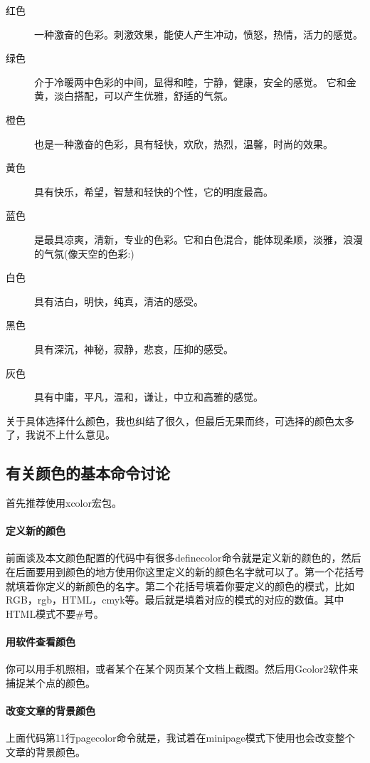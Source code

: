 \documentclass[11pt,oneside]{book}
\begin{document}
\begin{common-format}
\begin{description}
\item[红色] 一种激奋的色彩。刺激效果，能使人产生冲动，愤怒，热情，活力的感觉。
\item[绿色] 介于冷暖两中色彩的中间，显得和睦，宁静，健康，安全的感觉。 它和金黄，淡白搭配，可以产生优雅，舒适的气氛。
\item[橙色] 也是一种激奋的色彩，具有轻快，欢欣，热烈，温馨，时尚的效果。
\item[黄色] 具有快乐，希望，智慧和轻快的个性，它的明度最高。 
\item[蓝色] 是最具凉爽，清新，专业的色彩。它和白色混合，能体现柔顺，淡雅，浪漫的气氛(像天空的色彩:) 
\item[白色] 具有洁白，明快，纯真，清洁的感受。 
\item[黑色] 具有深沉，神秘，寂静，悲哀，压抑的感受。 
\item[灰色] 具有中庸，平凡，温和，谦让，中立和高雅的感觉。 　　
\end{description}
关于具体选择什么颜色，我也纠结了很久，但最后无果而终，可选择的颜色太多了，我说不上什么意见。

\subsection{有关颜色的基本命令讨论}
首先推荐使用xcolor宏包。

\paragraph{定义新的颜色}
前面谈及本文颜色配置的代码中有很多definecolor命令就是定义新的颜色的，然后在后面要用到颜色的地方使用你这里定义的新的颜色名字就可以了。第一个花括号就填着你定义的新颜色的名字。第二个花括号填着你要定义的颜色的模式，比如RGB，rgb，HTML，cmyk等。最后就是填着对应的模式的对应的数值。其中HTML模式不要\#号。

\paragraph{用软件查看颜色}
你可以用手机照相，或者某个在某个网页某个文档上截图。然后用Gcolor2软件来捕捉某个点的颜色。

\paragraph{改变文章的背景颜色}
上面代码第11行pagecolor命令就是，我试着在minipage模式下使用也会改变整个文章的背景颜色。


\end{common-format}
\end{document}
